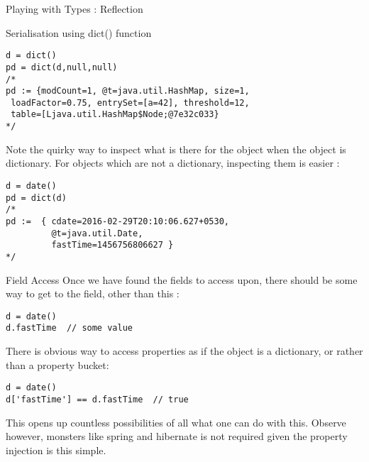 \begin{section}{Playing with Types : Reflection}
\begin{subsection}{Serialisation using dict() function}
\begin{center}\begin{minipage}{\linewidth}
\begin{lstlisting}[style=JexlStyle]
d = dict()
pd = dict(d,null,null)
/* 
pd := {modCount=1, @t=java.util.HashMap, size=1, 
 loadFactor=0.75, entrySet=[a=42], threshold=12, 
 table=[Ljava.util.HashMap$Node;@7e32c033} 
*/
\end{lstlisting}
\end{minipage}\end{center}

Note the quirky way to inspect what is there for the object when the object is dictionary.
For objects which are not a dictionary, inspecting them is easier :

\begin{center}\begin{minipage}{\linewidth}
\begin{lstlisting}[style=JexlStyle]
d = date()
pd = dict(d)
/* 
pd :=  { cdate=2016-02-29T20:10:06.627+0530, 
         @t=java.util.Date, 
         fastTime=1456756806627 } 
*/
\end{lstlisting}
\end{minipage}\end{center}

\end{subsection}

\begin{subsection}{Field Access}
Once we have found the fields to access upon, 
there should be some way to get to the field, other than this :

\begin{lstlisting}[style=JexlStyle]
d = date()
d.fastTime  // some value 
\end{lstlisting}

There is obvious way to access properties
as if the object is a dictionary, or rather than a property bucket:
\begin{lstlisting}[style=JexlStyle]
d = date()
d['fastTime'] == d.fastTime  // true 
\end{lstlisting}
This opens up countless possibilities of all what one can do with this.
Observe however, monsters like spring and hibernate is not required 
given the property injection is this simple. 
\end{subsection}



\end{section}























